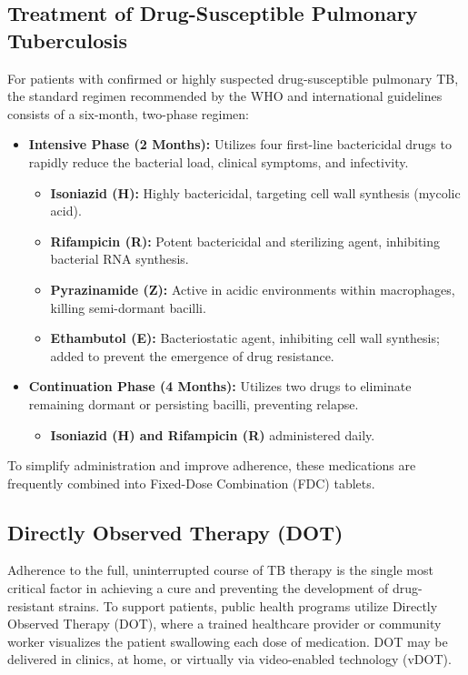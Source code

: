 \subsection*{Treatment of Drug-Susceptible Pulmonary Tuberculosis}
For patients with confirmed or highly suspected drug-susceptible pulmonary TB, the standard regimen recommended by the WHO and international guidelines consists of a six-month, two-phase regimen:

\begin{itemize}
    \item \textbf{Intensive Phase (2 Months):} Utilizes four first-line bactericidal drugs to rapidly reduce the bacterial load, clinical symptoms, and infectivity.
    \begin{itemize}
        \item \textbf{Isoniazid (H):} Highly bactericidal, targeting cell wall synthesis (mycolic acid).
        \item \textbf{Rifampicin (R):} Potent bactericidal and sterilizing agent, inhibiting bacterial RNA synthesis.
        \item \textbf{Pyrazinamide (Z):} Active in acidic environments within macrophages, killing semi-dormant bacilli.
        \item \textbf{Ethambutol (E):} Bacteriostatic agent, inhibiting cell wall synthesis; added to prevent the emergence of drug resistance.
    \end{itemize}
    \item \textbf{Continuation Phase (4 Months):} Utilizes two drugs to eliminate remaining dormant or persisting bacilli, preventing relapse.
    \begin{itemize}
        \item \textbf{Isoniazid (H) and Rifampicin (R)} administered daily.
    \end{itemize}
\end{itemize}

To simplify administration and improve adherence, these medications are frequently combined into Fixed-Dose Combination (FDC) tablets.

\subsection*{Directly Observed Therapy (DOT)}
Adherence to the full, uninterrupted course of TB therapy is the single most critical factor in achieving a cure and preventing the development of drug-resistant strains. To support patients, public health programs utilize Directly Observed Therapy (DOT), where a trained healthcare provider or community worker visualizes the patient swallowing each dose of medication. DOT may be delivered in clinics, at home, or virtually via video-enabled technology (vDOT).

